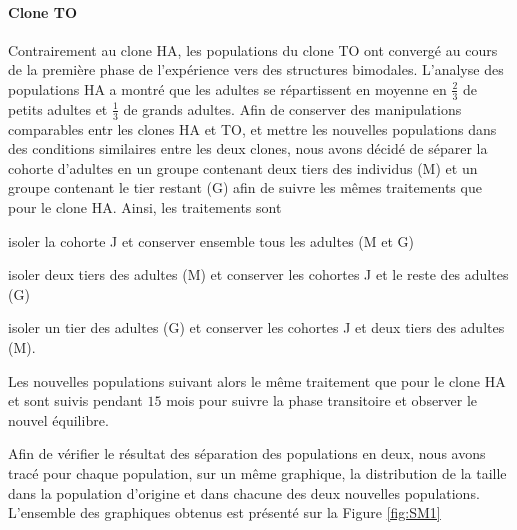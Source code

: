 \paragraph{Clone TO} Contrairement au clone HA, les populations du clone TO ont
convergé au cours de la première phase de l'expérience vers des structures
bimodales. L'analyse des populations HA a montré que les adultes se répartissent
en moyenne en $\frac{2}{3}$ de petits adultes et $\frac{1}{3}$ de grands
adultes. Afin de conserver des manipulations comparables entr les clones HA et
TO, et mettre les nouvelles populations dans des conditions similaires entre les
deux clones, nous avons décidé de séparer la cohorte d'adultes en un groupe
contenant deux tiers des individus (M) et un groupe contenant le tier restant
(G) afin de suivre les mêmes traitements que pour le clone HA.
Ainsi, les traitements sont \begin{enumerate*}[label=(\roman*), before=\unskip{ : }, itemjoin={{ ; }},
itemjoin*={{ ; et }}]
\item isoler la cohorte J et conserver ensemble tous les adultes (M et G)
\item isoler deux tiers des adultes (M) et conserver les cohortes J et le reste
des adultes (G)
\item isoler un tier des adultes (G) et conserver les cohortes J et deux tiers
des adultes (M).
\end{enumerate*} 
Les nouvelles populations suivant alors le même traitement que pour le clone HA
et sont suivis pendant $15$ mois pour suivre la phase transitoire et observer le
nouvel équilibre. 

Afin de vérifier le résultat des séparation des populations en deux, nous avons
tracé pour chaque population, sur un même graphique, la distribution de la
taille dans la population d'origine et dans chacune des deux nouvelles
populations. L'ensemble des graphiques obtenus est présenté sur la Figure
\ref{fig:SM1}

